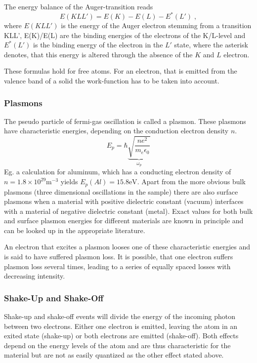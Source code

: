 \documentclass[a4paper]{scrartcl}
\numberwithin{equation}{section}
\numberwithin{figure}{section}
\numberwithin{table}{section}
\newcommand{\eq}[2]{\begin{equation}#1\label{#2}\end{equation}}
\begin{document}
The energy balance of the Auger-transition reads
\eq{E(KLL') = E(K) -E(L) - E^{*}(L') \; ,}{EKLL}
where $E(KLL')$ is the energy of the Auger electron stemming from a transition KLL', E(K)/E(L) are the binding energies of the electrons of the K/L-level and $E^*(L')$ is the binding energy of the electron in the $L'$ state, where the asterisk denotes, that this energy is altered through the absence of the $K$ and $L$ electron.

These formulas hold for free atoms. For an electron, that is emitted from the valence band of a solid the work-function has to be taken into account.


\subsubsection{Plasmons}
\label{sec:plasmonIntro}
The pseudo particle of fermi-gas oscillation is called a plasmon. These plasmons have characteristic energies, depending on the conduction electron density $n$. 
$$E_p = \hbar \underbrace{\sqrt{\frac{ne^2}{m_e \epsilon_0}}}_{\omega_p}$$
Eg. a calculation for aluminum, which has a conducting electron density of $n=1.8 \times 10^{29} \text{m}^{-3}$ yields $E_p(Al)=15.8 \text{eV}$.
Apart from the more obvious bulk plasmons (three dimensional oscillations in the sample) there are also surface plasmons when a material with positive dielectric constant (vacuum) interfaces with a material of negative dielectric constant (metal). Exact values for both bulk and surface plasmon energies for different materials are known in principle and can be looked up in the appropriate literature.

An electron that excites a plasmon looses one of these characteristic energies and is said to have suffered plasmon loss. It is possible, that one electron suffers plasmon loss several times, leading to a series of equally spaced losses with decreasing intensity.


\subsubsection{Shake-Up and Shake-Off}
Shake-up and shake-off events will divide the energy of the incoming photon between two electrons. Either one electron is emitted, leaving the atom in an exited state (shake-up) or both electrons are emitted (shake-off). Both effects depend on the energy levels of the atom and are thus characteristic for the material but are not as easily quantized as the other effect stated above.
\end{document}
